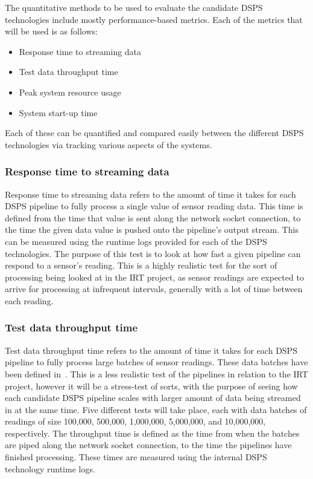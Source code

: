 The quantitative methods to be used to evaluate the candidate DSPS technologies include mostly performance-based
metrics. Each of the metrics that will be used is as follows:

\begin{itemize}
  \item Response time to streaming data
  \item Test data throughput time
  \item Peak system resource usage
  \item System start-up time
\end{itemize}

Each of these can be quantified and compared easily between the different DSPS technologies via tracking various aspects
of the systems.

\subsubsection{Response time to streaming data}

Response time to streaming data refers to the amount of time it takes for each DSPS pipeline to fully process a single
value of sensor reading data. This time is defined from the time that value is sent along the network socket connection, to the time
the given data value is pushed onto the pipeline's output stream. This can be measured using the runtime logs provided
for each of the DSPS technologies. The purpose of this test is to look at how fast a given pipeline can respond to a
sensor's reading. This is a highly realistic test for the sort of processing being looked at in the IRT project, as
sensor readings are expected to arrive for processing at infrequent intervals, generally with a lot of time between
each reading.

\subsubsection{Test data throughput time}

Test data throughput time refers to the amount of time it takes for each DSPS pipeline to fully process large batches
of sensor readings. These data batches have been defined in~. This is a less realistic
test of the pipelines in relation to the IRT project, however it will be a stress-test of sorts, with the purpose of
seeing how each candidate DSPS pipeline scales with larger amount of data being streamed in at the same time. Five different
tests will take place, each with data batches of readings of size 100,\@000, 500,\@000, 1,\@000,\@000, 5,\@000,\@000,
and 10,\@000,\@000, respectively. The throughput time is defined as the time from when the batches are piped along the network
socket connection, to the time the pipelines have finished processing. These times are measured using the internal DSPS
technology runtime logs.

